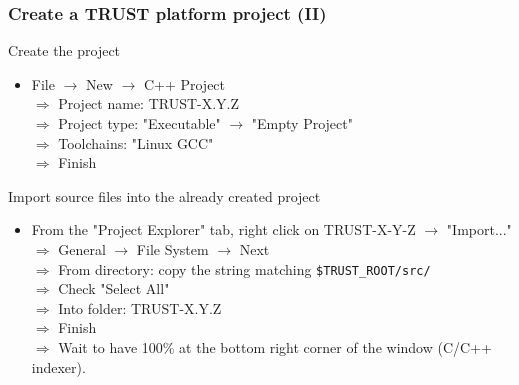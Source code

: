 \documentclass[10pt, hyperref={unicode=true,pdfusetitle, bookmarks=true,bookmarksnumbered=false,bookmarksopen=false, breaklinks=false,pdfborder={0 0 1},backref=true,colorlinks=true,linkcolor=darkblue,pageanchor, urlcolor=darkblue}]{beamer}
\begin{document}
\begin{frame}
\frametitle{Create a TRUST platform project (II)}

\begin{block}{Create the project}
\begin{itemize}
\item File $\rightarrow$ New  $\rightarrow$  C++ Project \\
 $\Rightarrow$ Project name: TRUST-X.Y.Z \\
 $\Rightarrow$ Project type: "Executable"  $\rightarrow$  "Empty Project" \\
 $\Rightarrow$ Toolchains: "Linux GCC" \\
 $\Rightarrow$ Finish
\end{itemize}
\end{block}

\begin{block}{Import source files into the already created project}
\begin{itemize}
\item From the "Project Explorer" tab, right click on TRUST-X-Y-Z  $\rightarrow$  "Import..." \\
  $\Rightarrow$ General  $\rightarrow$ File System $\rightarrow$ Next \\
  $\Rightarrow$ From directory: copy the string matching \texttt{\$TRUST\_ROOT/src/} \\
  $\Rightarrow$ Check "Select All" \\
  $\Rightarrow$ Into folder: TRUST-X.Y.Z \\
  $\Rightarrow$ Finish \\
  $\Rightarrow$ Wait to have 100\% at the bottom right corner of the window  (C/C++ indexer).
\end{itemize}
\end{block}

\end{frame}
\end{document}
